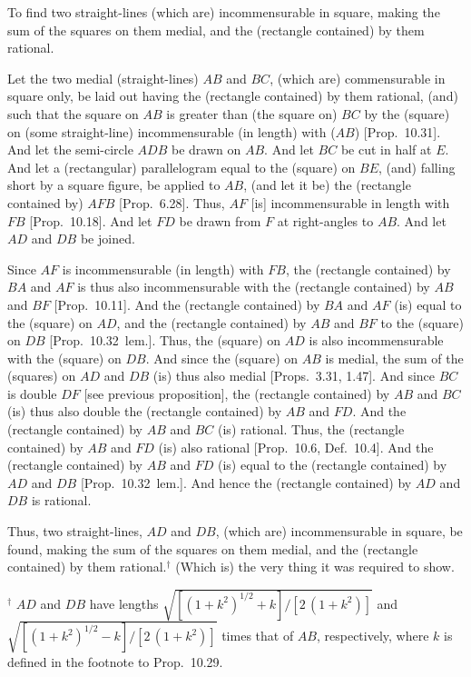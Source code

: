 \begin{Parallel}{}{}
{To find two straight-lines (which are) incommensurable in square, making the sum of the squares on them medial,
and the (rectangle contained) by them rational.

\centerline{}

Let the two medial (straight-lines) $AB$ and $BC$,
(which are) commensurable in square only, be laid out having the
(rectangle contained) by them rational, (and) such that the square on
$AB$ is greater than (the square on) $BC$ by the (square) on (some straight-line)
incommensurable (in length) with ($AB$) [Prop.~10.31].
And let the semi-circle $ADB$ be drawn on $AB$.
And let $BC$ be cut in half at $E$. And let a (rectangular) parallelogram
equal to the (square) on $BE$, (and) falling short by a square figure,
be applied to $AB$, (and let it be) the (rectangle
contained by) $AFB$ [Prop.~6.28].
Thus, $AF$ [is] incommensurable in length with $FB$
[Prop.~10.18]. And let 
$FD$ be drawn from $F$ at right-angles to $AB$.
And let $AD$ and $DB$ be joined.

Since $AF$ is incommensurable (in length) with $FB$, the (rectangle contained) by
$BA$ and $AF$ is thus also incommensurable with the (rectangle contained)
by $AB$ and $BF$ [Prop.~10.11].  And the
(rectangle contained) by $BA$ and $AF$ (is) equal to the (square) on $AD$, and the (rectangle contained) by $AB$ and $BF$ to the (square) on $DB$
[Prop.~10.32~lem.]. Thus, the (square) on
$AD$ is also incommensurable with the (square) on $DB$. And
since the (square) on $AB$ is medial, the sum of the (squares) on
$AD$ and $DB$ (is) thus also medial [Props.~3.31, 1.47]. And since $BC$ is double $DF$ [see previous proposition], the (rectangle
contained) by $AB$ and $BC$ (is) thus also double the (rectangle contained)
by $AB$ and $FD$. And the (rectangle contained) by $AB$ and $BC$ (is)
rational. Thus, the (rectangle contained) by $AB$ and $FD$
(is) also rational [Prop.~10.6, Def.~10.4]. And the (rectangle contained) by
$AB$ and $FD$ (is) equal to the (rectangle contained) by $AD$ and $DB$
[Prop.~10.32~lem.]. And hence the (rectangle
contained) by $AD$ and $DB$ is rational.

Thus, two straight-lines, $AD$ and $DB$, (which are) incommensurable
in square, be found, making the sum of the squares on them medial,
and the (rectangle contained) by them rational.$^\dag$
(Which is) the very thing
it was required to show.}
\end{Parallel}
{\footnotesize\noindent$^\dag$ $AD$ and $DB$ have lengths $\sqrt{[(1+k^2)^{1/2}+k]/[2\,(1+k^2)]}$
and  $\sqrt{[(1+k^2)^{1/2}-k]/[2\,(1+k^2)]}$ times that of $AB$, respectively, where $k$ is defined in the footnote
to Prop.~10.29.}

